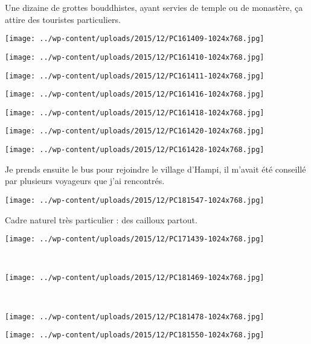 Une dizaine de grottes bouddhistes, ayant servies de temple ou de monastère, ça attire des touristes particuliers.
\begin{center} \texttt{[image: ../wp-content/uploads/2015/12/PC161409-1024x768.jpg]} \end{center}
\begin{center} \texttt{[image: ../wp-content/uploads/2015/12/PC161410-1024x768.jpg]} \end{center}
\begin{center} \texttt{[image: ../wp-content/uploads/2015/12/PC161411-1024x768.jpg]} \end{center}
\begin{center} \texttt{[image: ../wp-content/uploads/2015/12/PC161416-1024x768.jpg]} \end{center}
\begin{center} \texttt{[image: ../wp-content/uploads/2015/12/PC161418-1024x768.jpg]} \end{center}
\begin{center} \texttt{[image: ../wp-content/uploads/2015/12/PC161420-1024x768.jpg]} \end{center}
\vfill
\begin{center} \texttt{[image: ../wp-content/uploads/2015/12/PC161428-1024x768.jpg]} \end{center}
\vspace{-\topsep}
\vspace{-0.75mm}
\pagebreak

Je prends ensuite le bus pour rejoindre le village d'Hampi, il m'avait été conseillé par plusieurs voyageurs que j'ai rencontrés. 
\begin{center} \texttt{[image: ../wp-content/uploads/2015/12/PC181547-1024x768.jpg]} \end{center}

Cadre naturel très particulier : des cailloux partout.
\begin{center} \texttt{[image: ../wp-content/uploads/2015/12/PC171439-1024x768.jpg]} \end{center}
\vspace{-\topsep}
\pagebreak

~\\
\begin{center} \texttt{[image: ../wp-content/uploads/2015/12/PC181469-1024x768.jpg]} \end{center}
~
\begin{center} \texttt{[image: ../wp-content/uploads/2015/12/PC181478-1024x768.jpg]} \end{center}
\begin{center} \texttt{[image: ../wp-content/uploads/2015/12/PC181550-1024x768.jpg]} \end{center}

